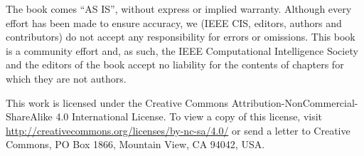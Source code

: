 
The book comes “AS IS”, without express or implied warranty. Although every effort has been made to ensure accuracy, we (IEEE CIS, editors, authors and contributors) do not accept any responsibility for errors or omissions.
This book is a community effort and, as such, the IEEE Computational Intelligence Society and the editors of the book accept no liability for the contents of chapters for which they are not authors. 

This work is licensed under the Creative Commons Attribution-NonCommercial-ShareAlike 4.0 International License. To view a copy of this license, visit \url{http://creativecommons.org/licenses/by-nc-sa/4.0/} or send a letter to Creative Commons, PO Box 1866, Mountain View, CA 94042, USA.

